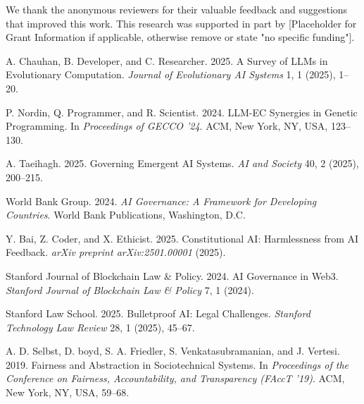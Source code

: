 \documentclass[manuscript,screen,review,anonymous,9pt]{acmart}
\begin{document}
\begin{acks}
	We thank the anonymous reviewers for their valuable feedback and suggestions that improved this work. This research was supported in part by [Placeholder for Grant Information if applicable, otherwise remove or state "no specific funding"].
\end{acks}


\begin{thebibliography}{99}

A. Chauhan, B. Developer, and C. Researcher. 2025.
\newblock A Survey of LLMs in Evolutionary Computation.
\newblock \emph{Journal of Evolutionary AI Systems} 1, 1 (2025), 1--20.

P. Nordin, Q. Programmer, and R. Scientist. 2024.
\newblock LLM-EC Synergies in Genetic Programming.
\newblock In \emph{Proceedings of GECCO '24}. ACM, New York, NY, USA, 123--130.

A. Taeihagh. 2025.
\newblock Governing Emergent AI Systems.
\newblock \emph{AI and Society} 40, 2 (2025), 200--215.

World Bank Group. 2024.
\newblock \emph{AI Governance: A Framework for Developing Countries}.
\newblock World Bank Publications, Washington, D.C.

Y. Bai, Z. Coder, and X. Ethicist. 2025.
\newblock Constitutional AI: Harmlessness from AI Feedback.
\newblock \emph{arXiv preprint arXiv:2501.00001} (2025).

Stanford Journal of Blockchain Law \& Policy. 2024.
\newblock AI Governance in Web3.
\newblock \emph{Stanford Journal of Blockchain Law \& Policy} 7, 1 (2024).

Stanford Law School. 2025.
\newblock Bulletproof AI: Legal Challenges.
\newblock \emph{Stanford Technology Law Review} 28, 1 (2025), 45--67.

A. D. Selbst, D. boyd, S. A. Friedler, S. Venkatasubramanian, and J. Vertesi. 2019.
\newblock Fairness and Abstraction in Sociotechnical Systems.
\newblock In \emph{Proceedings of the Conference on Fairness, Accountability, and Transparency (FAccT '19)}. ACM, New York, NY, USA, 59--68.


\end{thebibliography}
\end{document}
